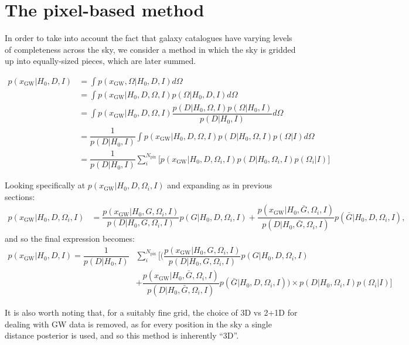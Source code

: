 \documentclass[a4paper,10pt]{article}
\begin{document}
{\section{The pixel-based method}
In order to take into account the fact that galaxy catalogues have varying levels of completeness across the sky, we consider a method in which the sky is gridded up into equally-sized pieces, which are later summed.

\begin{equation}
\begin{aligned}
p(x_{\text{GW}}|H_0,D,I) &= \int p(x_{\text{GW}},\Omega|H_0,D,I) d\Omega
\\ & = \int p(x_{\text{GW}}|H_0,D,\Omega,I) p(\Omega|H_0,D,I) d\Omega
\\ & = \int p(x_{\text{GW}}|H_0,D,\Omega,I) \dfrac{p(D|H_0,\Omega,I)p(\Omega|H_0,I)}{p(D|H_0,I)}  d\Omega
\\ &= \dfrac{1}{p(D|H_0,I)} \int p(x_{\text{GW}}|H_0,D,\Omega,I) p(D|H_0,\Omega,I)p(\Omega|I) d\Omega
\\ &= \dfrac{1}{p(D|H_0,I)} \sum^{N_{\text{pix}}}_i \bigg[p(x_{\text{GW}}|H_0,D,\Omega_i,I) p(D|H_0,\Omega_i,I)p(\Omega_i|I)\bigg]
\end{aligned} 
\end{equation}

Looking specifically at $p(x_{\text{GW}}|H_0,D,\Omega_i,I)$ and expanding as in previous sections:
\begin{equation}
\begin{aligned}
p(x_{\text{GW}}|H_0,D,\Omega_i,I) &= \dfrac{p(x_{\text{GW}}|H_0,G,\Omega_i,I)}{p(D|H_0,G,\Omega_i,I)} p(G|H_0,D,\Omega_i,I) + \dfrac{p(x_{\text{GW}}|H_0,\bar{G},\Omega_i,I)}{p(D|H_0,\bar{G},\Omega_i,I)} p(\bar{G}|H_0,D,\Omega_i,I),
\end{aligned}
\end{equation}
and so the final expression becomes:
\begin{equation}
\begin{aligned}
p(x_{\text{GW}}|H_0,D,I) = \dfrac{1}{p(D|H_0,I)} &\sum^{N_{\text{pix}}}_i \Bigg[ \bigg( \dfrac{p(x_{\text{GW}}|H_0,G,\Omega_i,I)}{p(D|H_0,G,\Omega_i,I)} p(G|H_0,D,\Omega_i,I) \\ &+ \dfrac{p(x_{\text{GW}}|H_0,\bar{G},\Omega_i,I)}{p(D|H_0,\bar{G},\Omega_i,I)} p(\bar{G}|H_0,D,\Omega_i,I) \bigg) \times p(D|H_0,\Omega_i,I)p(\Omega_i|I) \Bigg]
\end{aligned} 
\end{equation}

It is also worth noting that, for a suitably fine grid, the choice of 3D vs 2+1D for dealing with GW data is removed, as for every position in the sky a single distance posterior is used, and so this method is inherently ``3D''.



}
\end{document}
